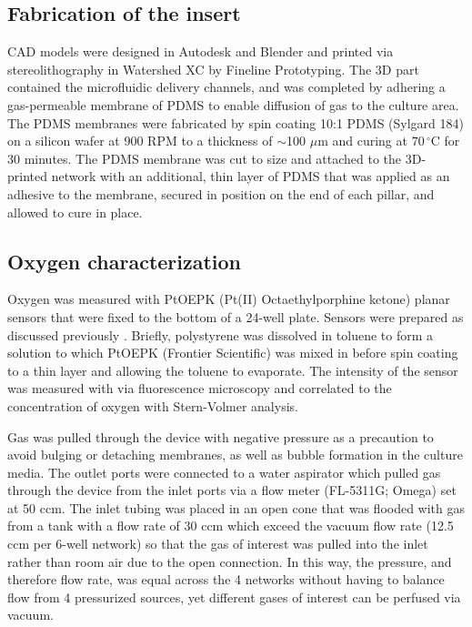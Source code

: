 \documentclass[10pt,letterpaper]{article}
\begin{document}
\subsection*{Fabrication of the insert}

CAD models were designed in Autodesk and Blender and printed via stereolithography in Watershed XC by Fineline Prototyping.
The 3D part contained the microfluidic delivery channels, and was completed by adhering a gas-permeable membrane of PDMS to enable diffusion of gas to the culture area. 
The PDMS membranes were fabricated by spin coating 10:1 PDMS (Sylgard 184) on a silicon wafer at 900 RPM to a thickness of $\sim$100 $\mu$m and curing at $70\,^{\circ}$C for 30 minutes.
The PDMS membrane was cut to size and attached to the 3D-printed network with an additional, thin layer of PDMS that was applied as an adhesive to the membrane, secured in position on the end of each pillar, and allowed to cure in place.

\subsection*{Oxygen characterization}

Oxygen was measured with PtOEPK (Pt(II) Octaethylporphine ketone) planar sensors that were fixed to the bottom of a 24-well plate.
Sensors were prepared as discussed previously \cite{Sinkala2010,Rexius-Hall2014}. 
Briefly, polystyrene was dissolved in toluene to form a solution to which PtOEPK (Frontier Scientific) was mixed in before spin coating to a thin layer and allowing the toluene to evaporate.
The intensity of the sensor was measured with via fluorescence microscopy and correlated to the concentration of oxygen with Stern-Volmer analysis.

Gas was pulled through the device with negative pressure as a precaution to avoid bulging or detaching membranes, as well as bubble formation in the culture media.
The outlet ports were connected to a water aspirator which pulled gas through the device from the inlet ports via a flow meter (FL-5311G; Omega) set at 50 ccm.
The inlet tubing was placed in an open cone that was flooded with gas from a tank with a flow rate of 30 ccm which exceed the vacuum flow rate (12.5 ccm per 6-well network) so that the gas of interest was pulled into the inlet rather than room air due to the open connection.
In this way, the pressure, and therefore flow rate, was equal across the 4 networks without having to balance flow from 4 pressurized sources, yet different gases of interest can be perfused via vacuum.
\end{document}
